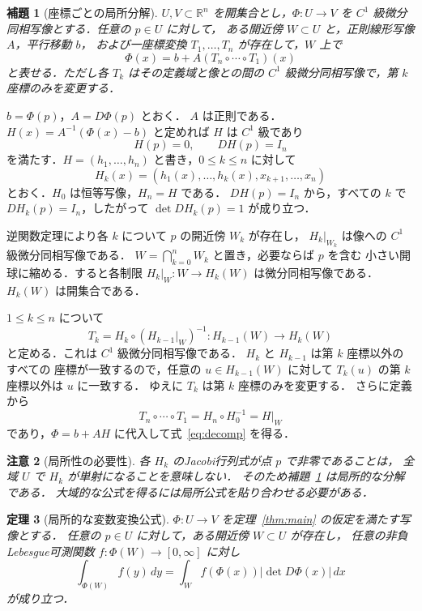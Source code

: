 \documentclass[a5paper,10pt,onecolumn]{jsarticle}
\makeatletter
\theoremstyle{mathnotetheorem}
\newtheorem{theorem}{定理}[section]
\newtheorem{lemma}[theorem]{補題}
\newtheorem{remark}[theorem]{注意}
\renewcommand{\proofname}{証明}
\renewenvironment{proof}[1][\proofname]{%
  \par\pushQED{\qed}\normalfont\topsep4\p@\@plus2\p@\relax
  \trivlist\item[\hskip\labelsep\bfseries #1]\ignorespaces
}{\popQED\endtrivlist\@endpefalse}
\newcommand{\R}{\mathbb{R}}
\newcommand{\abs}[1]{\lvert #1\rvert}
\makeatother
\begin{document}
\begin{lemma}[座標ごとの局所分解]\label{lem:decomposition}
$U,V\subset\R^n$ を開集合とし，$\Phi:U\to V$ を
$C^1$ 級微分同相写像とする．任意の $p\in U$ に対して，
ある開近傍 $W\subset U$ と，正則線形写像 $A$，平行移動 $b$，
および一座標変換 $T_1,\ldots,T_n$ が存在して，$W$ 上で
\begin{equation}\label{eq:decomp}
 \Phi(x)=b+A(T_n\circ\cdots\circ T_1)(x)
\end{equation}
と表せる．ただし各 $T_k$ はその定義域と像との間の
$C^1$ 級微分同相写像で，第 $k$ 座標のみを変更する．
\end{lemma}

\begin{proof}
$b=\Phi(p)$，$A=D\Phi(p)$ とおく．
$A$ は正則である．$H(x)=A^{-1}(\Phi(x)-b)$ と定めれば
$H$ は $C^1$ 級であり
\[
 H(p)=0,\qquad DH(p)=I_n
\]
を満たす．$H=(h_1,\ldots,h_n)$ と書き，$0\le k\le n$ に対して
\[
 H_k(x)=(h_1(x),\ldots,h_k(x),x_{k+1},\ldots,x_n)
\]
とおく．$H_0$ は恒等写像，$H_n=H$ である．
$DH(p)=I_n$ から，すべての $k$ で
$DH_k(p)=I_n$，したがって $\det DH_k(p)=1$ が成り立つ．

逆関数定理により各 $k$ について $p$ の開近傍 $W_k$ が存在し，
$H_k|_{W_k}$ は像への $C^1$ 級微分同相写像である．
$W=\bigcap_{k=0}^n W_k$ と置き，必要ならば $p$ を含む
小さい開球に縮める．すると各制限
$H_k|_W:W\to H_k(W)$ は微分同相写像である．
$H_k(W)$ は開集合である．

$1\le k\le n$ について
\[
 T_k=H_k\circ(H_{k-1}|_W)^{-1}:
 H_{k-1}(W)\longrightarrow H_k(W)
\]
と定める．これは $C^1$ 級微分同相写像である．
$H_k$ と $H_{k-1}$ は第 $k$ 座標以外のすべての
座標が一致するので，任意の $u\in H_{k-1}(W)$ に対して
$T_k(u)$ の第 $k$ 座標以外は $u$ に一致する．
ゆえに $T_k$ は第 $k$ 座標のみを変更する．
さらに定義から
\[
 T_n\circ\cdots\circ T_1
 =H_n\circ H_0^{-1}=H|_W
\]
であり，$\Phi=b+AH$ に代入して式~\eqref{eq:decomp} を得る．
\end{proof}

\begin{remark}[局所性の必要性]
各 $H_k$ のJacobi行列式が点 $p$ で非零であることは，
全域 $U$ で $H_k$ が単射になることを意味しない．
そのため補題~\ref{lem:decomposition} は局所的な分解である．
大域的な公式を得るには局所公式を貼り合わせる必要がある．
\end{remark}

\begin{theorem}[局所的な変数変換公式]\label{thm:local}
$\Phi:U\to V$ を定理~\ref{thm:main} の仮定を満たす写像とする．
任意の $p\in U$ に対して，ある開近傍 $W\subset U$ が存在し，
任意の非負Lebesgue可測関数 $f:\Phi(W)\to[0,\infty]$ に対し
\begin{equation}\label{eq:local}
 \int_{\Phi(W)}f(y)\,dy
 =\int_W f(\Phi(x))\abs{\det D\Phi(x)}\,dx
\end{equation}
が成り立つ．
\end{theorem}
\end{document}
